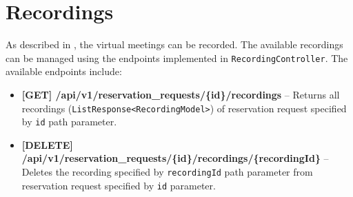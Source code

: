 \section{Recordings}
As described in , the virtual meetings can be recorded. The available recordings can be managed using the endpoints implemented in \texttt{RecordingController}. The available endpoints include:
\begin{itemize}
    \item \textbf{[GET] /api/v1/reservation\_requests/\{id\}/recordings} -- Returns all re\-cordings (\texttt{ListResponse<RecordingModel>}) of reservation request specified by \texttt{id} path parameter.
    \item \textbf{[DELETE] /api/v1/reservation\_requests/\{id\}/recordings/\{recordingId\}} -- Deletes the recording specified by \texttt{recordingId} path parameter from reservation request specified by \texttt{id} parameter.
\end{itemize}
